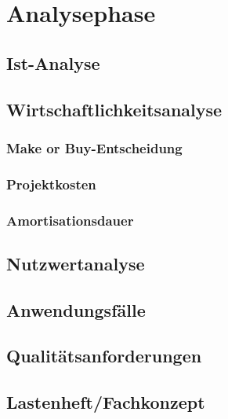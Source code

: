 \section{Analysephase}

	\subsection{Ist-Analyse}
	\subsection{Wirtschaftlichkeitsanalyse}
		\subsubsection{Make or Buy-Entscheidung}
		\subsubsection{Projektkosten}
		\subsubsection{Amortisationsdauer}
	\subsection{Nutzwertanalyse}
	\subsection{Anwendungsfälle}
	\subsection{Qualitätsanforderungen}
	\subsection{Lastenheft/Fachkonzept}
